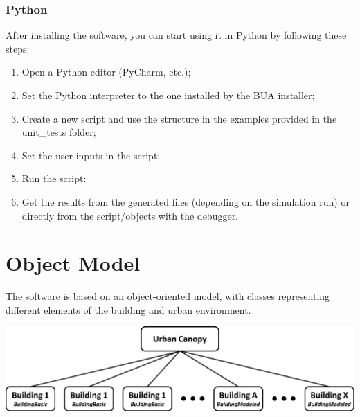 \documentclass[a4paper,12pt]{article} %
\begin{document}
    \subsubsection{Python}
    \label{subsubsec:quick-start-guide-python}
    After installing the software, you can start using it in Python by following these steps:
    \begin{enumerate}
        \item Open a Python editor (PyCharm, etc.);
        \item Set the Python interpreter to the one installed by the BUA installer;
        \item Create a new script and use the structure in the examples provided in the unit\_tests folder;
        \item Set the user inputs in the script;
        \item Run the script:
        \item Get the results from the generated files (depending on the simulation run) or directly from the script/objects with the debugger.
    \end{enumerate}


    \section{Object Model}
    \label{sec:object-model}
    The software is based on an object-oriented model, with classes representing different elements of the building and urban environment.

    \begin{center}
        \captionsetup{justification=centering} %
        \includegraphics[width=15cm]{Figures/Objects.png}%
        \label{fig SimulationObj}
    \end{center}
\end{document}
